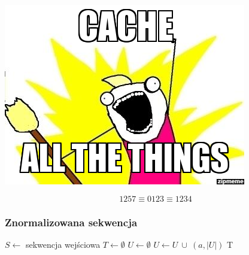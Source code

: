 \documentclass{beamer}
\begin{document}
\begin{frame}

\includegraphics[height=1\textheight]{img/cache-all-the-things.png}


\end{frame}

\begin{frame}
\begin{examples}
$$
1257 \equiv 0123 \equiv 1234
$$
\end{examples}
\end{frame}

\begin{frame}
\frametitle{Znormalizowana sekwencja}
\begin{algorithmic}
\State $S \gets $ sekwencja wejściowa
\State $T \gets \emptyset$
\State $U \gets \emptyset$
			\State
		\Else
			\State $U \gets U ~ \cup ~ (a, |U|)$
	    \EndIf
\EndFor
\State
\Return T
\end{algorithmic}

\end{frame}
\end{document}
